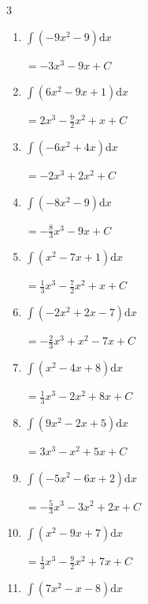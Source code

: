 \begin{multicols}{3}
\begin{enumerate}
        $\displaystyle =-2x^{3}-x^{2}-9x+ C$

  \item $\displaystyle \int \left( -9x^{2}-9 \right) \mathrm{d}x$

        $\displaystyle =-3x^{3}-9x+ C$

  \item $\displaystyle \int \left( 6x^{2}-9x+1 \right) \mathrm{d}x$

        $\displaystyle =2x^{3}-\frac{9}{2}x^{2}+x+ C$

  \item $\displaystyle \int \left( -6x^{2}+4x \right) \mathrm{d}x$

        $\displaystyle =-2x^{3}+2x^{2}+ C$

  \item $\displaystyle \int \left( -8x^{2}-9 \right) \mathrm{d}x$

        $\displaystyle =-\frac{8}{3}x^{3}-9x+ C$

  \item $\displaystyle \int \left( x^{2}-7x+1 \right) \mathrm{d}x$

        $\displaystyle =\frac{1}{3}x^{3}-\frac{7}{2}x^{2}+x+ C$

  \item $\displaystyle \int \left( -2x^{2}+2x-7 \right) \mathrm{d}x$

        $\displaystyle =-\frac{2}{3}x^{3}+x^{2}-7x+ C$

  \item $\displaystyle \int \left( x^{2}-4x+8 \right) \mathrm{d}x$

        $\displaystyle =\frac{1}{3}x^{3}-2x^{2}+8x+ C$

\columnbreak %

  \item $\displaystyle \int \left( 9x^{2}-2x+5 \right) \mathrm{d}x$

        $\displaystyle =3x^{3}-x^{2}+5x+ C$

  \item $\displaystyle \int \left( -5x^{2}-6x+2 \right) \mathrm{d}x$

        $\displaystyle =-\frac{5}{3}x^{3}-3x^{2}+2x+ C$

  \item $\displaystyle \int \left( x^{2}-9x+7 \right) \mathrm{d}x$

        $\displaystyle =\frac{1}{3}x^{3}-\frac{9}{2}x^{2}+7x+ C$

  \item $\displaystyle \int \left( 7x^{2}-x-8 \right) \mathrm{d}x$


\end{enumerate}
\end{multicols}
